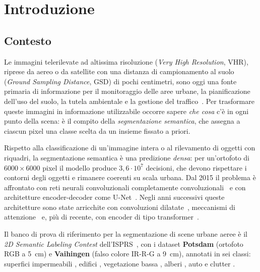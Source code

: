 \chapter{Introduzione}
\label{cap:introduzione}

\section{Contesto}
\label{sec:contesto}

Le immagini telerilevate ad altissima risoluzione (\emph{Very High Resolution}, VHR), riprese
da aereo o da satellite con una distanza di campionamento al suolo (\emph{Ground Sampling
Distance}, GSD) di pochi centimetri, sono oggi una fonte primaria di informazione per il
monitoraggio delle aree urbane, la pianificazione dell'uso del suolo, la tutela ambientale e la
gestione del traffico~\cite{zhu2017dlrs,cheng2016survey}. Per trasformare queste immagini in
informazione utilizzabile occorre sapere \emph{che cosa} c'è in ogni punto della scena: è il
compito della \emph{segmentazione semantica}, che assegna a ciascun pixel una classe scelta da un
insieme fissato a priori.

Rispetto alla classificazione di un'immagine intera o al rilevamento di oggetti con riquadri, la
segmentazione semantica è una predizione \emph{densa}: per un'ortofoto di $6000\times6000$ pixel
il modello produce $3{,}6\cdot10^{7}$ decisioni, che devono rispettare i contorni degli oggetti e
rimanere coerenti su scala urbana. Dal 2015 il problema è affrontato con reti neurali
convoluzionali completamente convoluzionali~\cite{long2015fcn} e con architetture
encoder-decoder come U-Net~\cite{ronneberger2015unet}. Negli anni successivi queste architetture
sono state arricchite con convoluzioni dilatate~\cite{chen2018deeplab}, meccanismi di
attenzione~\cite{wang2018nonlocal,fu2019danet} e, più di recente, con encoder di tipo
transformer~\cite{dosovitskiy2021vit,liu2021swin,xie2021segformer}.

Il banco di prova di riferimento per la segmentazione di scene urbane aeree è il \emph{2D
Semantic Labeling Contest} dell'ISPRS~\cite{rottensteiner2012isprs,isprs2dlabeling}, con i
dataset \textbf{Potsdam} (ortofoto RGB a \SI{5}{\centi\meter}) e \textbf{Vaihingen} (falso colore
IR-R-G a \SI{9}{\centi\meter}), annotati in sei classi: superfici impermeabili
, edifici , vegetazione bassa
, alberi , auto  e clutter
.

